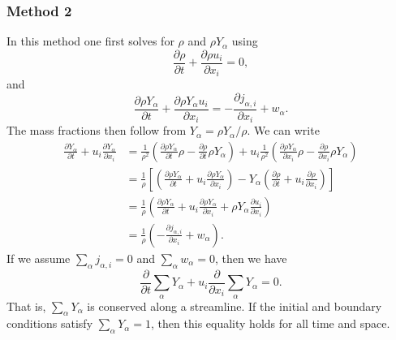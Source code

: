 \documentclass[oneside,a4paper,11pt]{report}
\begin{document}
\subsubsection{Method 2}
In this method one first solves for $\rho$ and $\rho Y_\alpha$ using 
\begin{equation*}
    \frac{\partial \rho}{\partial t} + \frac{\partial \rho u_i}{\partial x_i} = 0,
\end{equation*}
and    
\begin{equation*}
    \frac{\partial\rho Y_\alpha}{\partial t}+\frac{\partial \rho Y_\alpha u_i}{\partial x_i} = -\frac{\partial j_{\alpha,i}}{\partial x_i} + w_\alpha.
\end{equation*}
The mass fractions then follow from $Y_\alpha = \rho Y_\alpha / \rho$. We can write
\begin{align*}
    \frac{\partial Y_\alpha}{\partial t} + u_i \frac{\partial Y_\alpha}{\partial x_i} &= \frac{1}{\rho^2} \left( \frac{\partial \rho Y_\alpha}{\partial t} \rho - \frac{\partial \rho}{\partial t} \rho Y_\alpha \right) + u_i \frac{1}{\rho^2} \left( \frac{\partial \rho Y_\alpha}{\partial x_i} \rho - \frac{\partial \rho}{\partial x_i} \rho Y_\alpha \right)\\
    &= \frac{1}{\rho} \left[ \left( \frac{\partial \rho Y_\alpha}{\partial t} + u_i \frac{\partial \rho Y_\alpha}{\partial x_i} \right) - Y_\alpha \left( \frac{\partial \rho}{\partial t} + u_i \frac{\partial \rho}{\partial x_i} \right) \right] \\
    &= \frac{1}{\rho} \left( \frac{\partial \rho Y_\alpha}{\partial t} + u_i \frac{\partial \rho Y_\alpha}{\partial x_i} + \rho Y_\alpha \frac{\partial u_i}{\partial x_i} \right) \\
    &= \frac{1}{\rho} \left( -\frac{\partial j_{\alpha,i}}{\partial x_i} + w_\alpha \right).
\end{align*}
If we assume $\sum_\alpha j_{\alpha,i} = 0$ and $\sum_\alpha w_\alpha = 0$, then we have
\begin{equation}
    \frac{\partial}{\partial t} \sum_\alpha Y_\alpha + u_i \frac{\partial}{\partial x_i} \sum_\alpha Y_\alpha = 0.
\end{equation} 
That is, $\sum_\alpha Y_\alpha$ is conserved along a streamline. If the initial and boundary conditions satisfy $\sum_\alpha Y_\alpha=1$, then this equality holds for all time and space.
\end{document}
